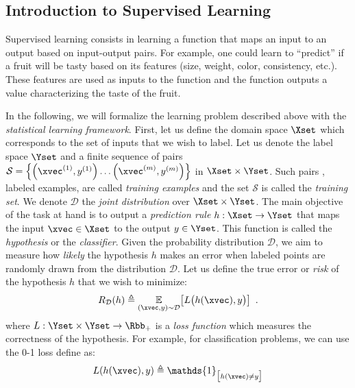 \subsection{Introduction to Supervised Learning}
\label{subsection:ch2-introduction_on_supervised_learning}

Supervised learning consists in learning a function that maps an input to an output based on input-output pairs.
For example, one could learn to ``predict'' if a fruit will be tasty based on its features (\eg size, weight, color, consistency, etc.).
These features are used as inputs to the function and the function outputs a value characterizing the taste of the fruit. 

In the following, we will formalize the learning problem described above with the \emph{statistical learning framework}.
First, let us define the domain space $\Xset$ which corresponds to the set of inputs that we wish to label.
Let us denote the label space $\Yset$ and a finite sequence of pairs $\mathcal{S} = \left\{ \left(\xvec^{(1)}, y^{(1)} \right) \dots \left( \xvec^{(m)}, y^{(m)} \right) \right\}$ in $\Xset \times \Yset$. 
Such pairs \ie, labeled examples, are called \emph{training examples} and the set $\mathcal{S}$ is called the \emph{training set}.
We denote $\mathcal{D}$ the \emph{joint distribution} over $\Xset \times \Yset$.
The main objective of the task at hand is to output a \emph{prediction rule} $h: \Xset \rightarrow \Yset$ that maps the input $\xvec \in \Xset$ to the output $y \in \Yset$.
This function is called the \emph{hypothesis} or the \emph{classifier}. 
Given the probability distribution $\mathcal{D}$, we aim to measure how \emph{likely} the hypothesis $h$ makes an error when labeled points are randomly drawn from the distribution $\mathcal{D}$.
Let us define the true error or \emph{risk} of the hypothesis $h$ that we wish to minimize:
\begin{equation} \label{equation:ch2-risk}
  R_{\mathcal{D}}(h) \triangleq \Ebb_{(\xvec, y) \sim \mathcal{D}} \left[ L\big( h(\xvec), y \big) \right] \enspace.
\end{equation}
where $L: \Yset \times \Yset \rightarrow \Rbb_{+}$ is a \emph{loss function} which measures the correctness of the hypothesis.
For example, for classification problems, we can use the 0-1 loss define as: %
\begin{equation}
  L(h(\xvec), y) \triangleq \mathds{1}_{\big[ h(\xvec) \neq y \big]}
\end{equation}

